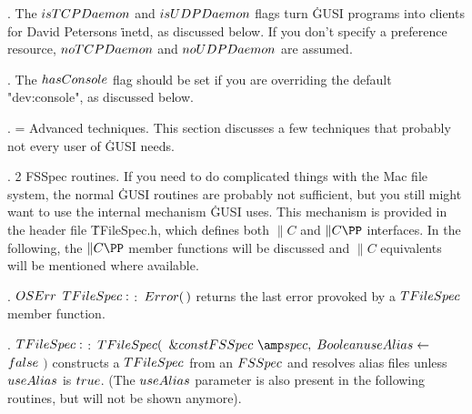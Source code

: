 \fi

. The \CD{}$\\{isTCPDaemon}$\DC{} and \CD{}$\\{isUDPDaemon}$\DC{} flags
turn \.{GUSI} programs into clients
for David Petersons \.{inetd}, as discussed below. If you don't specify a
preference
resource, \CD{}$\\{noTCPDaemon}$\DC{} and \CD{}$\\{noUDPDaemon}$\DC{} are
assumed.

\fi

. The \CD{}$\\{hasConsole}$\DC{} flag should be set if you are overriding
the default "dev:console",
as discussed below.

\fi

. = Advanced techniques. This section discusses a few techniques that
probably not
every user of \.{GUSI} needs.

\fi

. 2 FSSpec routines. If you need to do complicated things with the Mac
file system,
the normal \.{GUSI} routines are probably not sufficient, but you still might
want to use the internal mechanism \.{GUSI} uses. This mechanism is provided in
the header file \.{TFileSpec.h}, which defines both \CD{}$\|C$\DC{} and \CD{}$%
\|C\PP$\DC{} interfaces.
In the following, the \CD{}$\|C\PP$\DC{} member functions will be discussed and
\CD{}$\|C$\DC{} equivalents
will be mentioned where available.

\fi

. \CD{}$\\{OSErr}$ $\\{TFileSpec}:$ $:$ $\\{Error}(\,)$\DC{} returns the
last error provoked by a \CD{}$\\{TFileSpec}$\DC{} member
function.

\fi

. \CD{}$\\{TFileSpec}:$ $:$ $\\{TFileSpec}($ $\&{const}\ \\{FSSpec}\ {%
\amp}\\{spec},\;\ \\{Boolean}\ \\{useAlias}\leftarrow$ $\\{false}$ $)$\DC{}
constructs
a \CD{}$\\{TFileSpec}$\DC{} from an \CD{}$\\{FSSpec}$\DC{} and resolves alias
files unless \CD{}$\\{useAlias}$\DC{} is \CD{}$\\{true}$\DC{}.
(The \CD{}$\\{useAlias}$\DC{} parameter is also present in the following
routines, but will not
be shown anymore).

